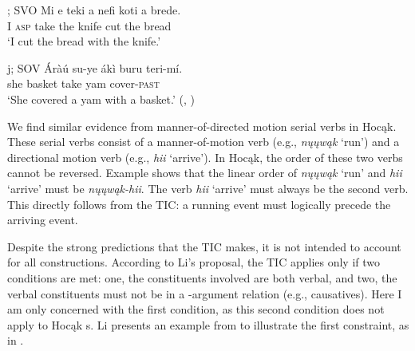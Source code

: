 \documentclass[output=paper]{LSP/langsci}
\begin{document}
\begin{exe}
\ex\label{ex:rosen:35}
\begin{xlist}

\ex {}; SVO
\gll Mi e teki a nefi koti a brede. \\
I \textsc{asp} take the knife cut the bread \\
\glt `I cut the bread with the knife.'

\ex {}j; SOV
 \gll \'Aràú su-ye ákì buru teri-mí. \\
she basket take yam cover-\textsc{past}\\
\glt `She covered a yam with a basket.' (\citealt[500]{Li1993}, )

\end{xlist}
\end{exe}

We find similar evidence from manner-of-directed motion serial verbs in Hocąk. These serial verbs consist of a manner-of-motion verb (e.g., \textit{nųųwąk} `run') and a directional motion verb (e.g., \textit{hii} `arrive'). In Hocąk, the order of these two verbs cannot be reversed. Example  shows that the linear order of \textit{nųųwąk} `run' and \textit{hii} `arrive' must be \textit{nųųwąk-hii}. The verb \textit{hii} `arrive' must always be the second verb. This directly follows from the TIC: a running event must logically precede the arriving event.

\begin{exe}
\ex\label{ex:rosen:36}
\begin{xlist}



\end{xlist}
\end{exe}

 
Despite the strong predictions that the TIC makes, it is not intended to account for all  constructions. According to Li's proposal, the TIC applies only if two conditions are met: one, the constituents involved are both verbal, and two, the verbal constituents must not be in a -argument relation (e.g., causatives). Here I am only concerned with the first condition, as this second condition does not apply to Hocąk s. Li presents an example from  to illustrate the first constraint, as in .
 
\end{document}
